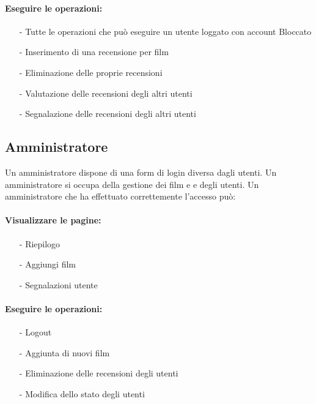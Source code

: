 \documentclass[a4paper]{article}
\begin{document}
    \paragraph*{Eseguire le operazioni:}
    \begin{itemize}
        \item[-] Tutte le operazioni che può eseguire un utente loggato con account Bloccato
        \item[-] Inserimento di una recensione per film
        \item[-] Eliminazione delle proprie recensioni
        \item[-] Valutazione delle recensioni degli altri utenti
        \item[-] Segnalazione delle recensioni degli altri utenti
    \end{itemize}

\subsection{Amministratore}
Un amministratore dispone di una form di login diversa dagli utenti.
Un amministratore si occupa della gestione dei film e e degli utenti.
Un amministratore che ha effettuato correttemente l'accesso può:

\paragraph*{Visualizzare le pagine:}
\begin{itemize}
    \item[-] Riepilogo
    \item[-] Aggiungi film
    \item[-] Segnalazioni utente
\end{itemize}

\paragraph*{Eseguire le operazioni:}
\begin{itemize}
    \item[-] Logout
    \item[-] Aggiunta di nuovi film 
    \item[-] Eliminazione delle recensioni degli utenti
    \item[-] Modifica dello stato degli utenti
\end{itemize}
\end{document}
